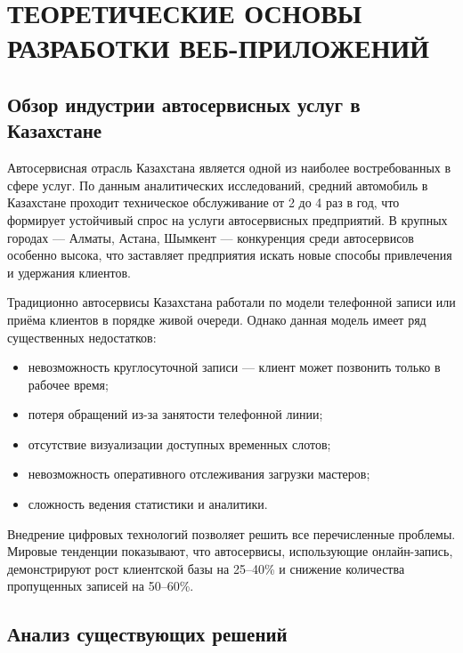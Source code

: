 \documentclass[14pt,a4paper,oneside]{extarticle}
\begin{document}
\newpage
\section{ТЕОРЕТИЧЕСКИЕ ОСНОВЫ РАЗРАБОТКИ ВЕБ-ПРИЛОЖЕНИЙ}

\subsection{Обзор индустрии автосервисных услуг в Казахстане}

Автосервисная отрасль Казахстана является одной из наиболее востребованных в сфере услуг. По данным аналитических исследований, средний автомобиль в Казахстане проходит техническое обслуживание от 2 до 4 раз в год, что формирует устойчивый спрос на услуги автосервисных предприятий. В крупных городах --- Алматы, Астана, Шымкент --- конкуренция среди автосервисов особенно высока, что заставляет предприятия искать новые способы привлечения и удержания клиентов.

Традиционно автосервисы Казахстана работали по модели телефонной записи или приёма клиентов в порядке живой очереди. Однако данная модель имеет ряд существенных недостатков:
\begin{itemize}[leftmargin=2cm]
    \item невозможность круглосуточной записи --- клиент может позвонить только в рабочее время;
    \item потеря обращений из-за занятости телефонной линии;
    \item отсутствие визуализации доступных временных слотов;
    \item невозможность оперативного отслеживания загрузки мастеров;
    \item сложность ведения статистики и аналитики.
\end{itemize}

Внедрение цифровых технологий позволяет решить все перечисленные проблемы. Мировые тенденции показывают, что автосервисы, использующие онлайн-запись, демонстрируют рост клиентской базы на 25--40\% и снижение количества пропущенных записей на 50--60\%.

\subsection{Анализ существующих решений}
\end{document}
